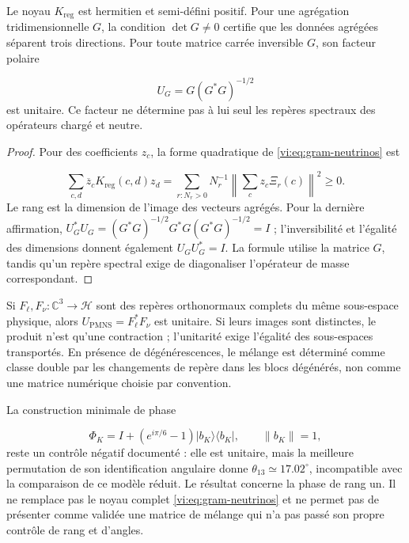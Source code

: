 \begin{proposition}
\label{vi:prop:gram-neutrinos}
Le noyau \(K_{\mathrm{reg}}\) est hermitien et semi-défini positif.
Pour une agrégation tridimensionnelle \(G\), la condition \(\det G\ne0\)
certifie que les données agrégées séparent trois directions. Pour toute
matrice carrée inversible \(G\), son facteur polaire

\[
 U_G=G(G^*G)^{-1/2}
\]
est unitaire. Ce facteur ne détermine pas à lui seul les repères spectraux
des opérateurs chargé et neutre.

\end{proposition}
\begin{proof}
Pour des coefficients \(z_c\), la forme quadratique de
\eqref{vi:eq:gram-neutrinos} est

\[
 \sum_{c,d}\overline z_cK_{\mathrm{reg}}(c,d)z_d
 =\sum_{r:N_r>0}N_r^{-1}
 \left\|\sum_c z_c\Xi_r(c)\right\|^2\ge0.
\]
Le rang est la dimension de l’image des vecteurs agrégés. Pour la
dernière affirmation,
\(U_G^*U_G=(G^*G)^{-1/2}G^*G(G^*G)^{-1/2}=I\) ;
l’inversibilité et l’égalité des dimensions donnent également \(U_GU_G^*=I\).
La formule utilise la matrice \(G\), tandis qu’un repère spectral exige de
diagonaliser l’opérateur de masse correspondant.

\end{proof}

Si \(F_\ell,F_\nu:\mathbb C^3\to\mathcal H\) sont des repères orthonormaux
complets du même sous-espace physique, alors
\(U_{\mathrm{PMNS}}=F_\ell^*F_\nu\) est unitaire. Si leurs images sont
distinctes, le produit n’est qu’une contraction ; l’unitarité exige
l’égalité des sous-espaces transportés. En présence de dégénérescences,
le mélange est déterminé comme classe double par les changements de repère dans
les blocs dégénérés, non comme une matrice numérique choisie par convention.


La construction minimale de phase

\[
 \Phi_K=I+(e^{i\pi/6}-1)|b_K\rangle\langle b_K|,
 \qquad\|b_K\|=1,
\]
reste un contrôle négatif documenté : elle est unitaire, mais la meilleure
permutation de son identification angulaire donne
\(\theta_{13}\simeq17.02^\circ\), incompatible avec la comparaison de ce
modèle réduit. Le résultat concerne la phase de rang un. Il ne
remplace pas le noyau complet \eqref{vi:eq:gram-neutrinos} et ne permet pas de
présenter comme validée une matrice de mélange qui n’a pas passé son propre
contrôle de rang et d’angles.


